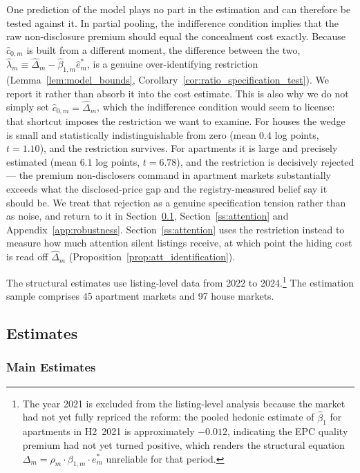 One prediction of the model plays no part in the estimation and can therefore be tested against it. In partial pooling, the indifference condition implies that the raw non-disclosure premium should equal the concealment cost exactly. Because $\hat c_{0,m}$ is built from a different moment, the difference between the two, $\hat\lambda_m\equiv\hat\Delta_m-\hat\beta_{1,m}\hat e^*_m$, is a genuine over-identifying restriction (Lemma~\ref{lem:model_bounds}, Corollary~\ref{cor:ratio_specification_test}). We report it rather than absorb it into the cost estimate. This is also why we do not simply set $\hat c_{0,m}=\hat\Delta_m$, which the indifference condition would seem to license: that shortcut imposes the restriction we want to examine. For houses the wedge is small and statistically indistinguishable from zero (mean $0.4$ log points, $t=1.10$), and the restriction survives. For apartments it is large and precisely estimated (mean $6.1$ log points, $t=6.78$), and the restriction is decisively rejected --- the premium non-disclosers command in apartment markets substantially exceeds what the disclosed-price gap and the registry-measured belief say it should be. We treat that rejection as a genuine specification tension rather than as noise, and return to it in Section~\ref{sec:results}, Section~\ref{ss:attention} and Appendix~\ref{app:robustness}. Section~\ref{ss:attention} uses the restriction instead to measure how much attention silent listings receive, at which point the hiding cost is read off $\hat\Delta_m$ (Proposition~\ref{prop:att_identification}).

The structural estimates use listing-level data from 2022 to 2024.\footnote{The year 2021 is excluded from the listing-level analysis because the market had not yet fully repriced the reform: the pooled hedonic estimate of $\hat\beta_{1}$ for apartments in H2~2021 is approximately $-0.012$, indicating the EPC quality premium had not yet turned positive, which renders the structural equation $\Delta_m = \rho_m\cdot\beta_{1,m}\cdot e^*_m$ unreliable for that period.} The estimation sample comprises 45 apartment markets and 97 house markets.

\subsection{Estimates}
\label{sec:results}

\subsubsection{Main Estimates}

